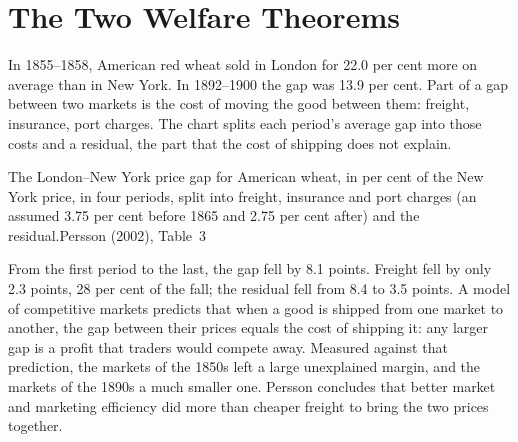 \chapter{The Two Welfare Theorems}\label{ch:b2:welfare-theorems}

In 1855--1858, American red wheat sold in London for 22.0 per cent more on average than in New York.
In 1892--1900 the gap was 13.9 per cent. Part of a gap between two markets is the cost of moving the
good between them: freight, insurance, port charges. The chart splits each period's average gap into
those costs and a residual, the part that the cost of shipping does not explain.

\begin{openingchart}{The London--New York price gap for American wheat, in per cent of the New York
  price, in four periods, split into freight, insurance and port charges (an assumed 3.75 per cent
  before 1865 and 2.75 per cent after) and the residual.}{Persson (2002), Table~3}
\end{openingchart}

From the first period to the last, the gap fell by 8.1 points. Freight fell by only 2.3 points, 28 per
cent of the fall; the residual fell from 8.4 to 3.5 points. A model of competitive markets predicts that
when a good is shipped from one market to another, the gap between their prices equals the cost of
shipping it: any larger gap is a profit that traders would compete away. Measured against that
prediction, the markets of the 1850s left a large unexplained margin, and the markets of the 1890s a
much smaller one. Persson concludes that better market and marketing efficiency did more than cheaper
freight to bring the two prices together.


